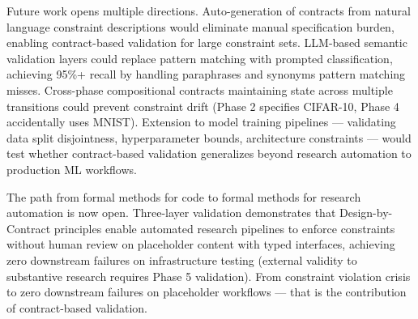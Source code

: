Future work opens multiple directions. Auto-generation of contracts from natural language constraint descriptions would eliminate manual specification burden, enabling contract-based validation for large constraint sets. LLM-based semantic validation layers could replace pattern matching with prompted classification, achieving 95\%+ recall by handling paraphrases and synonyms pattern matching misses. Cross-phase compositional contracts maintaining state across multiple transitions could prevent constraint drift (Phase 2 specifies CIFAR-10, Phase 4 accidentally uses MNIST). Extension to model training pipelines --- validating data split disjointness, hyperparameter bounds, architecture constraints --- would test whether contract-based validation generalizes beyond research automation to production ML workflows.

The path from formal methods for code to formal methods for research automation is now open. Three-layer validation demonstrates that Design-by-Contract principles enable automated research pipelines to enforce constraints without human review on placeholder content with typed interfaces, achieving zero downstream failures on infrastructure testing (external validity to substantive research requires Phase 5 validation). From constraint violation crisis to zero downstream failures on placeholder workflows --- that is the contribution of contract-based validation.
